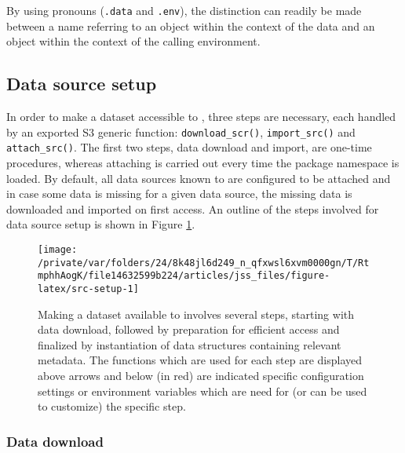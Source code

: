 \documentclass[
  notitle,
  nojss,
  noheadings]{jss}
\begin{document}
By using  pronouns (\texttt{.data} and \texttt{.env}), the
distinction can readily be made between a name referring to an object
within the context of the data and an object within the context of the
calling environment.

\hypertarget{data-source-setup}{%
\subsection{Data source setup}\label{data-source-setup}}

In order to make a dataset accessible to , three steps are
necessary, each handled by an exported S3 generic function:
\texttt{download\_scr()}, \texttt{import\_src()} and
\texttt{attach\_src()}. The first two steps, data download and import,
are one-time procedures, whereas attaching is carried out every time the
package namespace is loaded. By default, all data sources known to
 are configured to be attached and in case some data is
missing for a given data source, the missing data is downloaded and
imported on first access. An outline of the steps involved for data
source setup is shown in Figure \ref{fig:src-setup}.

\begin{CodeChunk}
\begin{figure}

{\centering \texttt{[image: /private/var/folders/24/8k48jl6d249\_n\_qfxwsl6xvm0000gn/T/RtmphhAogK/file14632599b224/articles/jss\_files/figure-latex/src-setup-1]} 

}

\caption[Making a dataset available to  involves several steps, starting with data download, followed by preparation for efficient access and finalized by instantiation of data structures containing relevant metadata]{Making a dataset available to  involves several steps, starting with data download, followed by preparation for efficient access and finalized by instantiation of data structures containing relevant metadata. The functions which are used for each step are displayed above arrows and below (in red) are indicated specific configuration settings or environment variables which are need for (or can be used to customize) the specific step.}\label{fig:src-setup}
\end{figure}
\end{CodeChunk}

\hypertarget{data-download}{%
\subsubsection{Data download}\label{data-download}}
\end{document}
